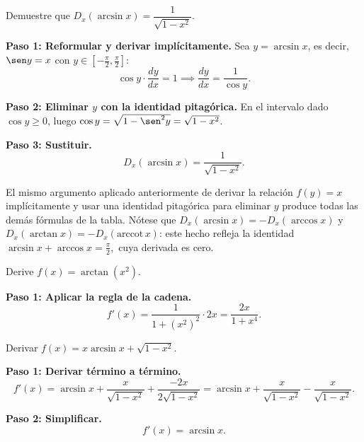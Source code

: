 \begin{example}
Demuestre que $D_x(\arcsin x) = \dfrac{1}{\sqrt{1-x^2}}$.

\begin{myproof}

\textbf{Paso 1: Reformular y derivar implícitamente.}
Sea $y=\arcsin x$, es decir, $\sen y = x$ con $y\in\left[-\frac{\pi}{2},
\frac{\pi}{2}\right]$:
\[
\cos y\cdot\frac{dy}{dx} = 1 \implies \frac{dy}{dx} = \frac{1}{\cos y}.
\]

\textbf{Paso 2: Eliminar $y$ con la identidad pitagórica.}
En el intervalo dado $\cos y \geq 0$, luego
$\cos y = \sqrt{1-\sen^2 y} = \sqrt{1-x^2}$.

\textbf{Paso 3: Sustituir.}
\[
\boxed{D_x(\arcsin x) = \frac{1}{\sqrt{1-x^2}}.}
\]
\end{myproof}
\end{example}

\begin{rem}
El mismo argumento aplicado anteriormente de derivar la relación $f(y)=x$ implícitamente y
usar una identidad pitagórica para eliminar $y$ produce todas las demás fórmulas de la tabla. Nótese que $D_x(\arcsin x) = -D_x(\arccos x)$
y $D_x(\arctan x) = -D_x(\text{arccot}\,x)$: este hecho refleja la
identidad $\arcsin x + \arccos x = \frac{\pi}{2},$ cuya derivada es cero.
\end{rem}

\begin{example}
Derive $f(x)=\arctan(x^2)$.

\begin{myproof}

\textbf{Paso 1: Aplicar la regla de la cadena.}
\[
\boxed{f'(x) = \dfrac{1}{1+(x^2)^2}\cdot 2x = \dfrac{2x}{1+x^4}.}
\]
\end{myproof}
\end{example}

\begin{example}
Derivar $f(x) = x\arcsin x + \sqrt{1-x^2}$.

\begin{myproof}

\textbf{Paso 1: Derivar término a término.}
\[
f'(x) = \arcsin x + \frac{x}{\sqrt{1-x^2}} + \frac{-2x}{2\sqrt{1-x^2}}
= \arcsin x + \frac{x}{\sqrt{1-x^2}} - \frac{x}{\sqrt{1-x^2}}.
\]

\textbf{Paso 2: Simplificar.}
\[
\boxed{f'(x) = \arcsin x.}
\]
\end{myproof}
\end{example}

